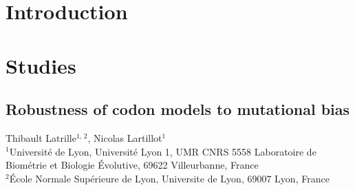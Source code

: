 \documentclass[a4paper,oneside,nobind]{thesis}
\begin{document}
\hypersetup{pageanchor=true}
\begin{romanpages}

\setlength{\baselineskip}{1.5\frontmatterbaselineskip}
\begin{alwayssingle}
	
\end{alwayssingle}

\setlength{\baselineskip}{\frontmatterbaselineskip}
\dominitoc %
\flushbottom
{
	\setlength{\baselineskip}{1.2\frontmatterbaselineskip}
	\hypersetup{linkcolor=GREYDARK}
	\tableofcontents
	\listoffigures
	\mtcaddchapter
	\listoftables
	\mtcaddchapter
}
{
	\setlength{\baselineskip}{1.2\frontmatterbaselineskip}
	
}

\end{romanpages}

\setlength{\baselineskip}{1.5\frontmatterbaselineskip}
\flushbottom


\pagestyle{fancybook}

\part{Introduction}

\label{part:intro}







\part{Studies}
\label{part:studies}

\thispagestyle{empty}
\chapter[Robustness of codon models to mutational bias]{Robustness of codon models to mutational bias}
\label{chap:NucleotideBias}

\begin{center}
	\Large Thibault Latrille$^{\text{1, 2}}$, Nicolas Lartillot$^{\text{1}}$\\
	\vspace{0.5cm}
	\normalsize
	$^{\text{1}}$Université de Lyon, Université Lyon 1, UMR CNRS 5558 Laboratoire de Biométrie et Biologie Évolutive, 69622 Villeurbanne, France\\
	$^{\text{2}}$École Normale Supérieure de Lyon, Universite de Lyon, 69007 Lyon, France\\
\end{center}
\end{document}
